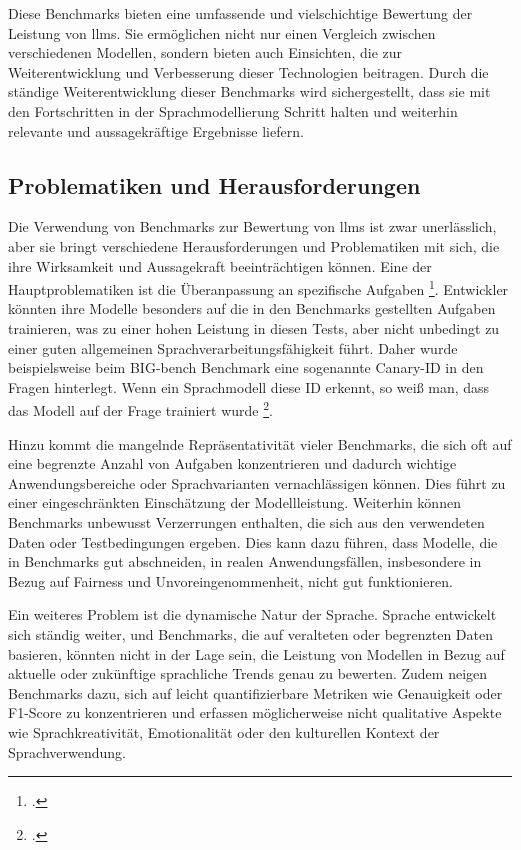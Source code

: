 Diese Benchmarks bieten eine umfassende und vielschichtige Bewertung der Leistung von \acp{llm}. Sie ermöglichen nicht nur einen Vergleich zwischen verschiedenen Modellen, sondern bieten auch Einsichten, die zur Weiterentwicklung und Verbesserung dieser Technologien beitragen. Durch die ständige Weiterentwicklung dieser Benchmarks wird sichergestellt, dass sie mit den Fortschritten in der Sprachmodellierung Schritt halten und weiterhin relevante und aussagekräftige Ergebnisse liefern.

\subsection{Problematiken und Herausforderungen} \label{sec:problematiken}

Die Verwendung von Benchmarks zur Bewertung von \acp{llm} ist zwar unerlässlich, aber sie bringt verschiedene Herausforderungen und Problematiken mit sich, die ihre Wirksamkeit und Aussagekraft beeinträchtigen können. Eine der Hauptproblematiken ist die Überanpassung an spezifische Aufgaben \footcite[Vgl.][S. 6]{zhou2023dont}. Entwickler könnten ihre Modelle besonders auf die in den Benchmarks gestellten Aufgaben trainieren, was zu einer hohen Leistung in diesen Tests, aber nicht unbedingt zu einer guten allgemeinen Sprachverarbeitungsfähigkeit führt.
Daher wurde beispielsweise beim BIG-bench Benchmark eine sogenannte Canary-ID in den Fragen hinterlegt.
Wenn ein Sprachmodell diese ID erkennt, so weiß man, dass das Modell auf der Frage trainiert wurde \footcite[Vgl.][S. 11]{srivastava2023imitation}.

Hinzu kommt die mangelnde Repräsentativität vieler Benchmarks, die sich oft auf eine begrenzte Anzahl von Aufgaben konzentrieren und dadurch wichtige Anwendungsbereiche oder Sprachvarianten vernachlässigen können. Dies führt zu einer eingeschränkten Einschätzung der Modellleistung. Weiterhin können Benchmarks unbewusst Verzerrungen enthalten, die sich aus den verwendeten Daten oder Testbedingungen ergeben. Dies kann dazu führen, dass Modelle, die in Benchmarks gut abschneiden, in realen Anwendungsfällen, insbesondere in Bezug auf Fairness und Unvoreingenommenheit, nicht gut funktionieren.

Ein weiteres Problem ist die dynamische Natur der Sprache. Sprache entwickelt sich ständig weiter, und Benchmarks, die auf veralteten oder begrenzten Daten basieren, könnten nicht in der Lage sein, die Leistung von Modellen in Bezug auf aktuelle oder zukünftige sprachliche Trends genau zu bewerten. Zudem neigen Benchmarks dazu, sich auf leicht quantifizierbare Metriken wie Genauigkeit oder F1-Score zu konzentrieren und erfassen möglicherweise nicht qualitative Aspekte wie Sprachkreativität, Emotionalität oder den kulturellen Kontext der Sprachverwendung.

